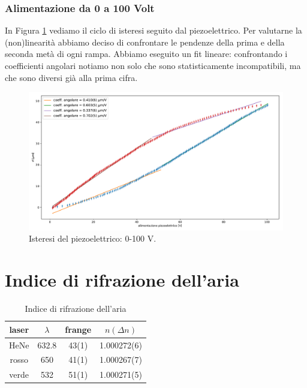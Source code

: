 \documentclass[a4paper]{article}
\begin{document}
\subsubsection{Alimentazione da 0 a 100 Volt}
In Figura \ref{fig:0-100} vediamo il ciclo di isteresi seguito dal piezoelettrico. Per valutarne la (non)linearità abbiamo deciso di confrontare le pendenze della prima e della seconda metà di ogni rampa. Abbiamo eseguito un fit lineare: confrontando i coefficienti angolari notiamo non solo che sono statisticamente incompatibili, ma che sono diversi già alla prima cifra.
\begin{figure}[H]
	\includegraphics[width=1\textwidth]{isteresi_0-100.pdf}
	\caption{Isteresi del piezoelettrico: 0-100 V.}
	\label{fig:0-100}
\end{figure}

\section{Indice di rifrazione dell'aria}

\begin{table}[H]
	\centering
	\begin{tabular}{|c|c|c|c|}
		\hline
		laser & $\lambda$ & frange  & $n(\Delta n)$ \\
		\hline
		HeNe & 632.8 & 43(1) &1.000272(6)\\
		rosso & 650 & 41(1) &1.000267(7)\\ 
		verde & 532 & 51(1) &1.000271(5)\\
		\hline
	\end{tabular}
	\caption{Indice di rifrazione dell'aria}
	\label{tab:n}
\end{table}
\end{document}
